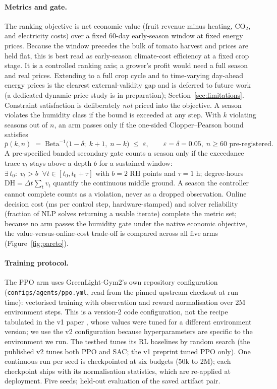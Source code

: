 \documentclass[11pt]{article}
\begin{document}
\paragraph{Metrics and gate.} The ranking objective is net economic value (fruit revenue minus heating, CO$_2$, and electricity costs) over a fixed 60-day early-season window at fixed energy prices. Because the window precedes the bulk of tomato harvest and prices are held flat, this is best read as early-season climate-cost efficiency at a fixed crop stage. It is a controlled ranking axis; a grower's profit would need a full season and real prices. Extending to a full crop cycle and to time-varying day-ahead energy prices is the clearest external-validity gap and is deferred to future work (a dedicated dynamic-price study is in preparation); Section~\ref{sec:limitations}. Constraint satisfaction is deliberately \emph{not} priced into the objective. A season violates the humidity class if the bound is exceeded at any step. With $k$
violating seasons out of $n$, an arm passes only if the one-sided Clopper--Pearson
bound \citep{clopper1934} satisfies
\begin{equation}
  \overline{p}(k, n) \;=\; \mathrm{Beta}^{-1}\!\big(1-\delta;\; k+1,\; n-k\big) \;\le\; \varepsilon,
  \qquad \varepsilon = \delta = 0.05,\; n \ge 60 \text{ pre-registered}.
  \label{eq:gate}
\end{equation}
A pre-specified banded secondary gate counts a season only if the exceedance trace
$v_t$ stays above a depth $b$ for a sustained window:
$\exists\, t_0: \; v_t > b \;\; \forall t \in [t_0, t_0 + \tau]$ with $b = 2$ RH points
and $\tau = 1$ h; degree-hours $\mathrm{DH} = \Delta t \sum_t v_t$ quantify the
continuous middle ground. A season the controller cannot complete counts as a violation, never as a dropped observation. Online decision cost (ms per control step, hardware-stamped) and solver reliability (fraction of NLP solves returning a usable iterate) complete the metric set; because no arm passes the humidity gate under the native economic objective, the value-versus-online-cost trade-off is compared across all five arms (Figure~\ref{fig:pareto}).

\paragraph{Training protocol.} The PPO arm uses GreenLight-Gym2's own repository configuration (\texttt{configs/agents/ppo.yml}, read from the pinned upstream checkout at run time): vectorised training with observation and reward normalisation over 2M environment steps. This is a version-2 code configuration, not the recipe tabulated in the v1 paper \citep{vanlaatum2024greenlight}, whose values were tuned for a different environment version; we use the v2 configuration because hyperparameters are specific to the environment we run. The testbed tunes its RL baselines by random search (the published v2 tunes both PPO and SAC; the v1 preprint tuned PPO only). One continuous run per seed is checkpointed at six budgets (50k to 2M); each checkpoint ships with its normalisation statistics, which are re-applied at deployment. Five seeds; held-out evaluation of the saved artifact pair.
\end{document}

